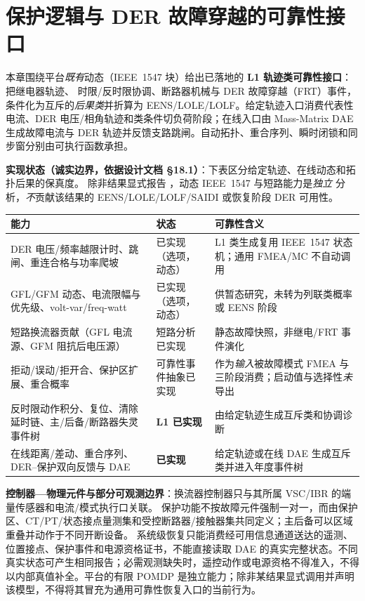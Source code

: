 \section{保护逻辑与 DER 故障穿越的可靠性接口}\label{sec:rel-pf}

\begin{theorynote}
本章围绕平台\emph{既有}动态（IEEE~1547 块）给出已落地的 \textbf{L1 轨迹类可靠性接口}：把继电器轨迹、
时限/反时限协调、断路器机械与 DER 故障穿越（FRT）事件，条件化为互斥的\emph{后果类}并折算为
EENS/LOLE/LOLF。给定轨迹入口消费代表性电流、DER 电压/相角轨迹和类条件切负荷阶段；在线入口由 Mass-Matrix DAE
生成故障电流与 DER 轨迹并反馈支路跳闸。自动拓扑、重合序列、瞬时闭锁和同步窗分别由可执行函数承担。
\end{theorynote}

\begin{boundarynote}
\textbf{实现状态（诚实边界，依据设计文档 \S18.1）}：下表区分给定轨迹、在线动态和拓扑后果的保真度。
除非结果显式报告 ，动态 IEEE~1547 与短路能力是\emph{独立}
分析，\emph{不}贡献该结果的 EENS/LOLE/LOLF/SAIDI 或恢复阶段 DER 可用性。
\begin{center}\footnotesize
\begin{tabular}{@{}L{5.7cm}L{2.5cm}L{5.5cm}@{}}
\toprule
能力 & 状态 & 可靠性含义\\
\midrule
DER 电压/频率越限计时、跳闸、重连合格与功率爬坡 & 已实现（选项，动态）& L1 类生成复用 IEEE~1547 状态机；通用 FMEA/MC 不自动调用\\
GFL/GFM 动态、电流限幅与优先级、volt-var/freq-watt & 已实现（选项，动态）& 供暂态研究，未转为列联类概率或 EENS 阶段\\
短路换流器贡献（GFL 电流源、GFM 阻抗后电压源）& 短路分析已实现 & 静态故障快照，非继电/FRT 事件演化\\
拒动/误动/拒开合、保护区扩展、重合概率 & 可靠性事件抽象已实现 & 作为\emph{输入}被故障模式 FMEA 与三阶段消费；启动值与选择性\emph{未}导出\\
反时限动作积分、复位、清除延时链、主/后备/断路器失灵事件树 & \textbf{L1 已实现} & 由给定轨迹生成互斥类和协调诊断\\
在线距离/差动、重合序列、DER--保护双向反馈与 DAE & \textbf{已实现} & 给定轨迹或在线 DAE 生成互斥类并进入年度事件树\\
\bottomrule
\end{tabular}
\end{center}
\end{boundarynote}

\begin{boundarynote}
\textbf{控制器—物理元件与部分可观测边界}：换流器控制器只与其所属 VSC/IBR 的端量传感器和电流/模式执行口关联。
保护功能不按故障元件强制一对一，而由保护区、CT/PT/状态接点量测集和受控断路器/接触器集共同定义；主后备可以区域重叠并动作于不同开断设备。
系统级恢复只能消费经可用信息通道送达的遥测、位置接点、保护事件和电源资格证书，不能直接读取 DAE 的真实完整状态。不同真实状态可产生相同报告；必需观测缺失时，遥控动作或电源资格不得准入，不得以内部真值补全。平台的有限 POMDP 是独立能力；除非某结果显式调用并声明该模型，不得将其冒充为通用可靠性恢复入口的当前行为。
\end{boundarynote}


